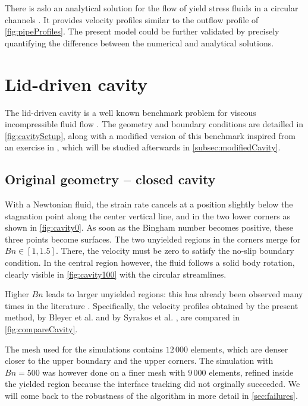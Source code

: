 \documentclass[11 pt]{report}
\begin{document}
There is aslo an analytical solution for the flow of yield stress fluids in a circular channels \cite{circularProfile}. It provides velocity profiles similar to the outflow profile of \cref{fig:pipeProfiles}. The present model could be further validated by precisely quantifying the difference between the numerical and analytical solutions.

\pagebreak
\section{Lid-driven cavity}

The lid-driven cavity is a well known benchmark problem for viscous incompressible fluid flow \cite{FEMfluid}. The geometry and boundary conditions are detailled in \cref{fig:cavitySetup}, along with a modified version of this benchmark inspired from an exercise in \cite{hoffmann}, which will be studied afterwards in \cref{subsec:modifiedCavity}.



\subsection{Original geometry -- closed cavity}

With a Newtonian fluid, the strain rate cancels at a position slightly below the stagnation point along the center vertical line, and in the two lower corners as shown in \cref{fig:cavity0}. As soon as the Bingham number becomes positive, these three points become surfaces. The two unyielded regions in the corners merge for $Bn\in[1,1.5]$. There, the velocity must be zero to satisfy the no-slip boundary condition. In the central region however, the fluid follows a solid body rotation, clearly visible in \cref{fig:cavity100} with the circular streamlines.

Higher $Bn$ leads to larger unyielded regions: this has already been observed many times in the literature \cite{Bleyer,Syrakos,Treskatis}. Specifically, the velocity profiles obtained by the present method, by Bleyer et al. \cite{Bleyer} and by Syrakos et al. \cite{Syrakos}, are compared in \cref{fig:compareCavity}. 

The mesh used for the simulations contains $12\,000$ elements, which are denser closer to the upper boundary and the upper corners. The simulation with $Bn=500$ was however done on a finer mesh with $9\,000$ elements, refined inside the yielded region because the interface tracking did not orginally succeeded. We will come back to the robustness of the algorithm in more detail in \cref{sec:failures}.
\end{document}

